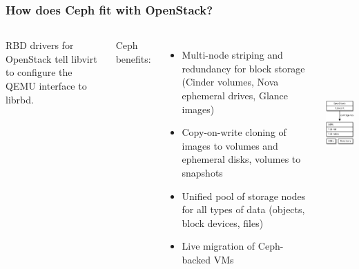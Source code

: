 \documentclass[hyperref=unicode,utf8,xcolor=pst,aspectratio=169]{beamer}
\begin{document}
\begin{frame}
	\frametitle{How does Ceph fit with OpenStack?}
	\begin{columns}[T]
		RBD drivers for OpenStack tell libvirt to configure the QEMU
		interface to librbd.

		\vspace{2ex}
		Ceph benefits:
		\begin{itemize}
			\item Multi-node striping and redundancy for block
				storage (Cinder volumes, Nova ephemeral drives,
				Glance images)
			\item Copy-on-write cloning of images to volumes and
				ephemeral disks, volumes to snapshots
			\item Unified pool of storage nodes for all types of
				data (objects, block devices, files)
			\item Live migration of Ceph-backed VMs
		\end{itemize}

		\includegraphics[height=6.5cm]{ceph-rbd-openstack}
	\end{columns}
\end{frame}
\end{document}
